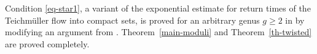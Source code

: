 \documentclass[JEP,XML,SOM,Unicode]{cedram}
\theoremstyle{plain}
\theoremstyle{definition}
\begin{document}
Condition \eqref{eq-star1}, a variant of the exponential estimate for return times of the Teichmüller flow into compact sets, is proved for an arbitrary genus $g\ge 2$ in \cite[Prop.\,11.3]{BuSo18a} by modifying an
argument from \cite{buf-jams}. Theorem~\ref{main-moduli} and Theorem~\ref{th-twisted} are proved completely.

\backmatter


\end{document}
